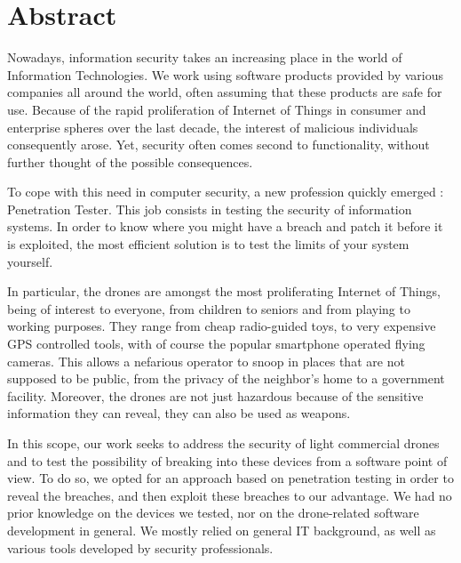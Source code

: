\chapter*{Abstract}
\thispagestyle{empty}

\vspace{-3cm}
\vfill

\begin{center}
\begin{minipage}{15cm}
Nowadays, information security takes an increasing place in the world of Information Technologies. We work using software products provided by various companies all around the world, often assuming that these products are safe for use. Because of the rapid proliferation of Internet of Things in consumer and enterprise spheres over the last decade, the interest of malicious individuals consequently arose. Yet, security often comes second to functionality, without further thought of the possible consequences. 
\newline

To cope with this need in computer security, a new profession quickly emerged : Penetration Tester. This job consists in testing the security of information systems. In order to know where you might have a breach and patch it before it is exploited, the most efficient solution is to test the limits of your system yourself.
\newline

In particular, the drones are amongst the most proliferating Internet of Things, being of interest to everyone, from children to seniors and from playing to working purposes. They range from cheap radio-guided toys, to very expensive GPS controlled tools, with of course the popular smartphone operated flying cameras. This allows a nefarious operator to snoop in places that are not supposed to be public, from the privacy of the neighbor's home to a government facility. Moreover, the drones are not just hazardous because of the sensitive information they can reveal, they can also be used as weapons.
\newline

In this scope, our work seeks to address the security of light commercial drones and to test the possibility of breaking into these devices from a software point of view. To do so, we opted for an approach based on penetration testing in order to reveal the breaches, and then exploit these breaches to our advantage. We had no prior knowledge on the devices we tested, nor on the drone-related software development in general. We mostly relied on general IT background, as well as various tools developed by security professionals.
\newline


\end{minipage}
\end{center}
